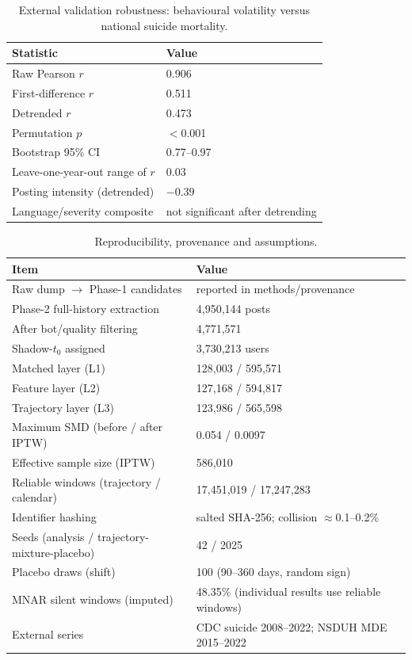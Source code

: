 \documentclass[11pt]{article}
\begin{document}
\begin{table}[h]\centering\small
\caption{External validation robustness: behavioural volatility versus national suicide
mortality.}
\label{tab:st2}
\begin{tabular}{ll}
\toprule
Statistic & Value \\
\midrule
Raw Pearson $r$ & 0.906 \\
First-difference $r$ & 0.511 \\
Detrended $r$ & 0.473 \\
Permutation $p$ & $<$0.001 \\
Bootstrap 95\% CI & 0.77--0.97 \\
Leave-one-year-out range of $r$ & 0.03 \\
Posting intensity (detrended) & $-0.39$ \\
Language/severity composite & not significant after detrending \\
\bottomrule
\end{tabular}
\end{table}

\begin{table}[h]\centering\small
\caption{Reproducibility, provenance and assumptions.}
\label{tab:st3}
\begin{tabular}{ll}
\toprule
Item & Value \\
\midrule
Raw dump $\rightarrow$ Phase-1 candidates & reported in methods/provenance \\
Phase-2 full-history extraction & 4{,}950{,}144 posts \\
After bot/quality filtering & 4{,}771{,}571 \\
Shadow-$t_0$ assigned & 3{,}730{,}213 users \\
Matched layer (L1) & 128{,}003 / 595{,}571 \\
Feature layer (L2) & 127{,}168 / 594{,}817 \\
Trajectory layer (L3) & 123{,}986 / 565{,}598 \\
Maximum SMD (before / after IPTW) & 0.054 / 0.0097 \\
Effective sample size (IPTW) & 586{,}010 \\
Reliable windows (trajectory / calendar) & 17{,}451{,}019 / 17{,}247{,}283 \\
Identifier hashing & salted SHA-256; collision $\approx$0.1--0.2\% \\
Seeds (analysis / trajectory-mixture-placebo) & 42 / 2025 \\
Placebo draws (shift) & 100 (90--360 days, random sign) \\
MNAR silent windows (imputed) & 48.35\% (individual results use reliable windows) \\
External series & CDC suicide 2008--2022; NSDUH MDE 2015--2022 \\
\bottomrule
\end{tabular}
\end{table}
\end{document}
